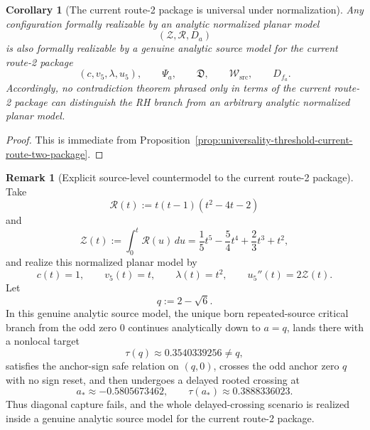 \documentclass[11pt,a4paper]{amsart}
\theoremstyle{plain}
\newtheorem{corollary}[theorem]{Corollary}
\theoremstyle{definition}
\newtheorem{remark}[theorem]{Remark}
\begin{document}
\begin{corollary}[The current route-2 package is universal under normalization]
\label{cor:current-route-two-package-universal-under-normalization}
Any configuration formally realizable by an analytic normalized planar model
\[
(\mathcal Z,\mathcal R,D_a)
\]
is also formally realizable by a genuine analytic source model for the current
route-2 package
\[
(c,v_5,\lambda,u_5),\qquad
\Psi_a,\qquad
\mathfrak D,\qquad
\mathcal W_{\mathrm{src}},\qquad
D_{f_a}.
\]
Accordingly, no contradiction theorem phrased only in terms of the current
route-2 package can distinguish the RH branch from an arbitrary analytic
normalized planar model.
\end{corollary}

\begin{proof}
This is immediate from
Proposition~\ref{prop:universality-threshold-current-route-two-package}.
\end{proof}

\begin{remark}[Explicit source-level countermodel to the current route-2 package]
\label{rem:explicit-source-level-countermodel-current-route-two}
Take
\[
\mathcal R(t):=t(t-1)(t^2-4t-2)
\]
and
\[
\mathcal Z(t):=\int_0^t \mathcal R(u)\,du
=
\frac15 t^5-\frac54 t^4+\frac23 t^3+t^2,
\]
and realize this normalized planar model by
\[
c(t)=1,\qquad v_5(t)=t,\qquad \lambda(t)=t^2,\qquad u_5''(t)=2\mathcal Z(t).
\]
Let
\[
q:=2-\sqrt6.
\]
In this genuine analytic source model, the unique born repeated-source critical
branch from the odd zero $0$ continues analytically down to $a=q$, lands
there with a nonlocal target
\[
\tau(q)\approx 0.3540339256\neq q,
\]
satisfies the anchor-sign safe relation on $(q,0)$, crosses the odd anchor
zero $q$ with no sign reset, and then undergoes a delayed rooted crossing at
\[
a_*\approx -0.5805673462,
\qquad
\tau(a_*)\approx 0.3888336023.
\]
Thus diagonal capture fails, and the whole delayed-crossing scenario is
realized inside a genuine analytic source model for the current route-2
package.
\end{remark}
\end{document}
